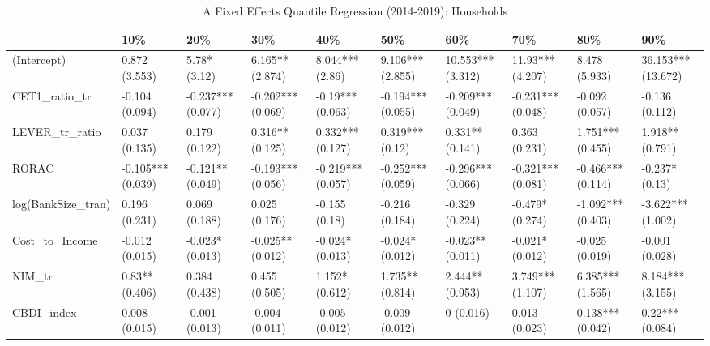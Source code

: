 \begin{table}[ht]
\centering
\caption{A Fixed Effects Quantile Regression (2014-2019): Households} 
\begingroup\small
\begin{tabular}{llllllllll}
  \toprule
 & 10\% & 20\% & 30\% & 40\% & 50\% & 60\% & 70\% & 80\% & 90\% \\ 
  \midrule
(Intercept) & 0.872 (3.553) & 5.78* (3.12) & 6.165** (2.874) & 8.044*** (2.86) & 9.106*** (2.855) & 10.553*** (3.312) & 11.93*** (4.207) & 8.478 (5.933) & 36.153*** (13.672) \\ 
  CET1\_ratio\_tr & -0.104 (0.094) & -0.237*** (0.077) & -0.202*** (0.069) & -0.19*** (0.063) & -0.194*** (0.055) & -0.209*** (0.049) & -0.231*** (0.048) & -0.092 (0.057) & -0.136 (0.112) \\ 
  LEVER\_tr\_ratio & 0.037 (0.135) & 0.179 (0.122) & 0.316** (0.125) & 0.332*** (0.127) & 0.319*** (0.12) & 0.331** (0.141) & 0.363 (0.231) & 1.751*** (0.455) & 1.918** (0.791) \\ 
  RORAC & -0.105*** (0.039) & -0.121** (0.049) & -0.193*** (0.056) & -0.219*** (0.057) & -0.252*** (0.059) & -0.296*** (0.066) & -0.321*** (0.081) & -0.466*** (0.114) & -0.237* (0.13) \\ 
  log(BankSize\_tran) & 0.196 (0.231) & 0.069 (0.188) & 0.025 (0.176) & -0.155 (0.18) & -0.216 (0.184) & -0.329 (0.224) & -0.479* (0.274) & -1.092*** (0.403) & -3.622*** (1.002) \\ 
  Cost\_to\_Income & -0.012 (0.015) & -0.023* (0.013) & -0.025** (0.012) & -0.024* (0.013) & -0.024* (0.012) & -0.023** (0.011) & -0.021* (0.012) & -0.025 (0.019) & -0.001 (0.028) \\ 
  NIM\_tr & 0.83** (0.406) & 0.384 (0.438) & 0.455 (0.505) & 1.152* (0.612) & 1.735** (0.814) & 2.444** (0.953) & 3.749*** (1.107) & 6.385*** (1.565) & 8.184*** (3.155) \\ 
  CBDI\_index & 0.008 (0.015) & -0.001 (0.013) & -0.004 (0.011) & -0.005 (0.012) & -0.009 (0.012) & 0 (0.016) & 0.013 (0.023) & 0.138*** (0.042) & 0.22*** (0.084) \\ 
   \bottomrule
\end{tabular}
\endgroup
\end{table}
